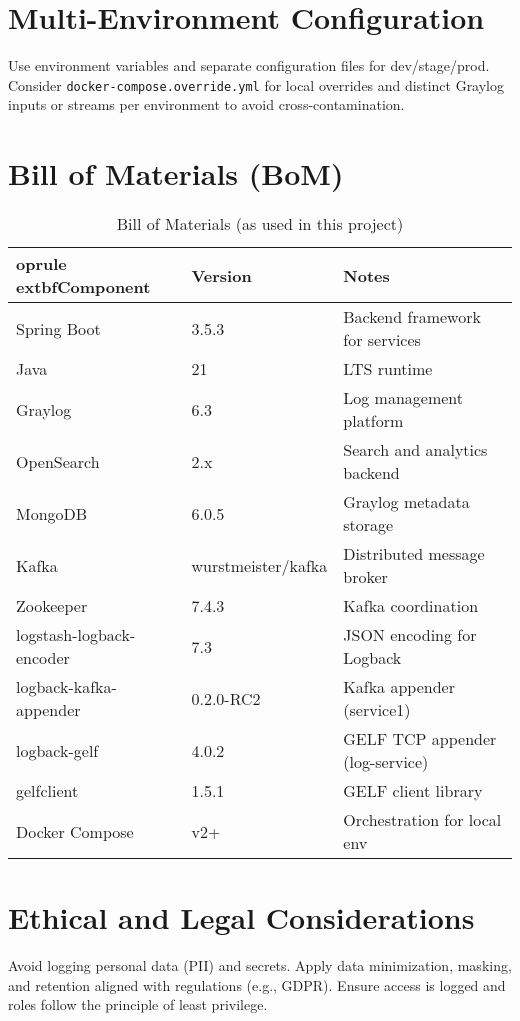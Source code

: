 \documentclass[12pt,a4paper]{report}
\begin{document}
\chapter{Multi-Environment Configuration}
Use environment variables and separate configuration files for dev/stage/prod. Consider \texttt{docker-compose.override.yml} for local overrides and distinct Graylog inputs or streams per environment to avoid cross-contamination.

\chapter{Bill of Materials (BoM)}
\begin{table}[H]
\centering
\begin{tabular}{llp{7cm}}
	oprule
	extbf{Component} & \textbf{Version} & \textbf{Notes} \\
\midrule
Spring Boot & 3.5.3 & Backend framework for services \\
Java & 21 & LTS runtime \\
Graylog & 6.3 & Log management platform \\
OpenSearch & 2.x & Search and analytics backend \\
MongoDB & 6.0.5 & Graylog metadata storage \\
Kafka & wurstmeister/kafka & Distributed message broker \\
Zookeeper & 7.4.3 & Kafka coordination \\
logstash-logback-encoder & 7.3 & JSON encoding for Logback \\
logback-kafka-appender & 0.2.0-RC2 & Kafka appender (service1) \\
logback-gelf & 4.0.2 & GELF TCP appender (log-service) \\
gelfclient & 1.5.1 & GELF client library \\
Docker Compose & v2+ & Orchestration for local env \\
\bottomrule
\end{tabular}
\caption{Bill of Materials (as used in this project)}
\end{table}

\chapter{Ethical and Legal Considerations}
Avoid logging personal data (PII) and secrets. Apply data minimization, masking, and retention aligned with regulations (e.g., GDPR). Ensure access is logged and roles follow the principle of least privilege.
\end{document}
